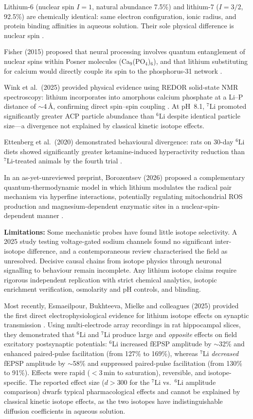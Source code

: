 \documentclass[10pt, a4paper, twocolumn]{article}
\begin{document}
Lithium-6 (nuclear spin $I=1$, natural abundance 7.5\%) and lithium-7
($I=3/2$, 92.5\%) are chemically identical: same electron configuration,
ionic radius, and protein binding affinities in aqueous solution. Their
sole physical difference is nuclear spin \cite{fisher2015}.

Fisher (2015) proposed that neural processing involves quantum
entanglement of nuclear spins within Posner molecules
(Ca$_9$(PO$_4$)$_6$), and that lithium substituting for calcium would
directly couple its spin to the phosphorus-31 network
\cite{fisher2015}.

Wink et al.\ (2025) provided physical evidence using REDOR solid-state
NMR spectroscopy: lithium incorporates into amorphous calcium phosphate
at a Li--P distance of $\sim$4\,\AA, confirming direct spin--spin
coupling \cite{wink2025}. At pH~8.1, $^7$Li promoted significantly
greater ACP particle abundance than $^6$Li despite identical particle
size---a divergence not explained by classical kinetic isotope effects.

Ettenberg et al.\ (2020) demonstrated behavioural divergence: rats on
30-day $^6$Li diets showed significantly greater ketamine-induced
hyperactivity reduction than $^7$Li-treated animals by the fourth trial
\cite{ettenberg2020}.

In an as-yet-unreviewed preprint, Borozentsev (2026) proposed a
complementary quantum-thermodynamic model in which lithium modulates
the radical pair mechanism via hyperfine interactions, potentially
regulating mitochondrial ROS production and magnesium-dependent
enzymatic sites in a nuclear-spin-dependent manner
\cite{borozentsev2026}.

\textbf{Limitations:} Some mechanistic probes have found little isotope
selectivity. A 2025 study testing voltage-gated sodium channels found no
significant inter-isotope difference, and a contemporaneous review
characterised the field as unresolved. Decisive causal chains from
isotope physics through neuronal signalling to behaviour remain
incomplete. Any lithium isotope claims require rigorous independent
replication with strict chemical analytics, isotopic enrichment
verification, osmolarity and pH controls, and blinding.

Most recently, Esmaeilpour, Bukhteeva, Mielke and colleagues
(2025) provided the first direct electrophysiological evidence
for lithium isotope effects on synaptic transmission
\cite{esmaeilpour2025mea}. Using multi-electrode array
recordings in rat hippocampal slices, they demonstrated that
$^6$Li and $^7$Li produce large and \emph{opposite} effects on
field excitatory postsynaptic potentials: $^6$Li increased fEPSP
amplitude by $\sim$32\% and enhanced paired-pulse facilitation
(from 127\% to 169\%), whereas $^7$Li \emph{decreased} fEPSP
amplitude by $\sim$58\% and suppressed paired-pulse facilitation
(from 130\% to 91\%). Effects were rapid ($<$3\,min to
saturation), reversible, and isotope-specific. The reported
effect size ($d > 300$ for the $^7$Li vs.\ $^6$Li amplitude
comparison) dwarfs typical pharmacological effects and cannot be
explained by classical kinetic isotope effects, as the two
isotopes have indistinguishable diffusion coefficients in aqueous
solution.
\end{document}
